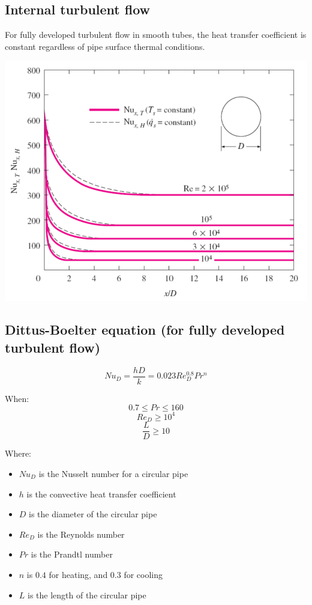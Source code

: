 \documentclass[11pt]{article}
\begin{document}
 \newpage
\subsection{Internal turbulent flow}
\label{sec:org4681d78}
For fully developed turbulent flow in smooth tubes, the heat transfer coefficient is constant regardless of pipe surface thermal conditions.
\begin{center}
\includegraphics[width=.9\linewidth]{./images/internal-turbulent-flow-graph.png}
\end{center}

 \newpage
\subsection{Dittus-Boelter equation (for fully developed turbulent flow)}
\label{sec:orgc983c55}
\[Nu_D = \frac{hD}{k} = 0.023 Re_D^{0.8} Pr^n\]

When:
\[0.7 \le Pr \le 160\]
\[Re_D \ge 10^4\]
\[\frac{L}{D} \ge 10\]

Where:
\begin{itemize}
\item \(Nu_D\) is the Nusselt number for a circular pipe
\item \(h\) is the convective heat transfer coefficient
\item \(D\) is the diameter of the circular pipe
\item \(Re_D\) is the Reynolds number
\item \(Pr\) is the Prandtl number
\item \(n\) is \(0.4\) for heating, and \(0.3\) for cooling
\item \(L\) is the length of the circular pipe
\end{itemize}
\end{document}
